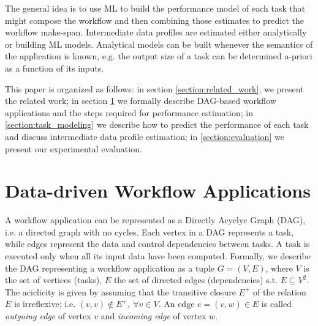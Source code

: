 \documentclass[a4paper, 10pt, conference]{ieeeconf}      %
\begin{document}
The general idea is to use ML to build the performance model of each task that might compose the workflow and then combining those estimates to predict the workflow make-span. Intermediate data profiles are estimated either analytically or building ML models. Analytical models can be built whenever the semantics of the application is known, e.g. the output size of a task can be determined a-priori as a function of its inputs. 

This paper is organized as follows: in section \ref{section:related_work}, we present the related work; in section \ref{section:dag_applications} we formally describe DAG-based workflow applications and the steps required for performance estimation; in \ref{section:task_modeling} we describe how to predict the performance of each task and discuss intermediate data profile estimation; in \ref{section:evaluation} we present our experimental evaluation.



\section{Data-driven Workflow Applications}
\label{section:dag_applications}


A workflow application can be represented as a Directly Acyclyc Graph (DAG), i.e. a directed graph with no cycles. Each vertex in a DAG represents a task, while edges represent the data and control dependencies between tasks.  A task is executed only when all its input data have been computed.
Formally, we describe the DAG representing a workflow application as a tuple $G=(V,E)$, where $V$ is the set of vertices (tasks), $E$ the set of directed edges (dependencies) s.t. $E\subseteq V^2$.
The aciclicity is given by assuming that the transitive closure $E^+$ of the relation $E$ is irreflexive; i.e. $(v, v) \not \in E ^+ ,\ \forall v \in V$. An edge  $e=(v,w)\in E$ is called \textit{outgoing edge} of vertex $v$ and \textit{incoming edge} of vertex $w$.
\end{document}
